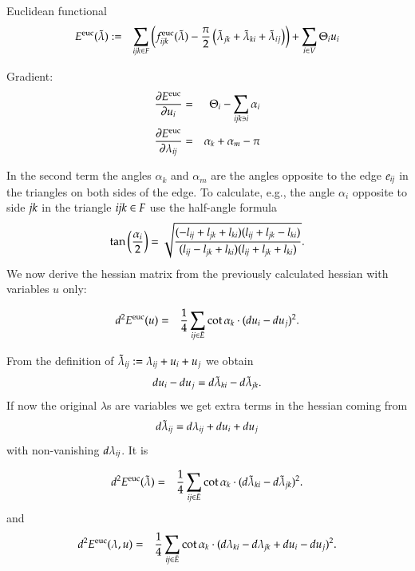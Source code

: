 \documentclass[Thesis.tex]{subfiles}
\begin{document}
\begin{definition}{Euclidean functional}
\begin{eqnarray}
	E^{\rm euc}(\tilde\lambda) &:=& \sum_{\it ijk\in F}\left(f^{\rm euc}_{\it ijk}(\tilde\lambda) - \frac{\pi}{2}\left(\tilde \lambda_{jk} + \tilde \lambda_{ki} + \tilde \lambda_{ij}\right)\right) + \sum_{i\in V} \Theta_i u_i
\end{eqnarray}
\end{definition}

Gradient:
\begin{eqnarray}
	\frac{\partial E^{\rm euc}}{\partial u_i} &=& \Theta_i - \sum_{\it ijk\ni i}\alpha_i \\
	\frac{\partial E^{\rm euc}}{\partial \lambda_{\it ij}} &=& \alpha_k + \alpha_m - \pi\label{eq:lambda_deriv_euc}
\end{eqnarray}

In the second term the angles $\alpha_k$ and $\alpha_m$ are the angles opposite to the edge $e_{\it ij}$ in the 
triangles on both sides of the edge. To calculate, e.g., the angle $\alpha_i$ opposite to side $\it jk$ in the triangle $\it ijk \in F$ use the half-angle formula
\[\tan\left(\frac{\alpha_i}{2}\right) = \sqrt{\frac
{(-l_{\it ij} +l_{\it jk} +l_{\it ki})(l_{\it ij} +l_{\it jk} -l_{\it ki})}
{(l_{\it ij} -l_{\it jk} +l_{\it ki})(l_{\it ij} + l_{\it jk} +l_{\it ki})}}.\]
We now derive the hessian matrix from the previously calculated hessian with variables $u$ only:

\begin{eqnarray}
d^2E^{\rm euc}(u)&=&\frac{1}{4}\sum_{\it ij \in \bar E} \cot \alpha_k \cdot (du_i - du_j)^2.
\end{eqnarray}

From the definition of $\tilde\lambda_{\it ij} := \lambda_{\it ij}+u_i+u_j$ we obtain
\[du_i-du_j=d\tilde\lambda_{\it ki}-d\tilde\lambda_{\it jk}.\]
If now the original $\lambda$s are variables we get extra terms in the hessian coming from 
\[d\tilde\lambda_{\it ij}=d\lambda_{\it ij}+du_i+du_j\]
with non-vanishing $d\lambda_{\it ij}$. It is

\begin{eqnarray*}
d^2E^{\rm euc}(\tilde\lambda)
&=&\frac{1}{4}\sum_{\it ij \in \bar E} \cot \alpha_k \cdot (d\tilde\lambda_{\it ki}-d\tilde\lambda_{\it jk})^2.
\end{eqnarray*}
and
\begin{eqnarray*}
d^2E^{\rm euc}(\lambda, u)&=&\frac{1}{4}\sum_{\it ij \in \bar E} \cot \alpha_k \cdot (d\lambda_{\it ki}-d\lambda_{\it jk} + du_i - du_j)^2.
\end{eqnarray*}
\end{document}

